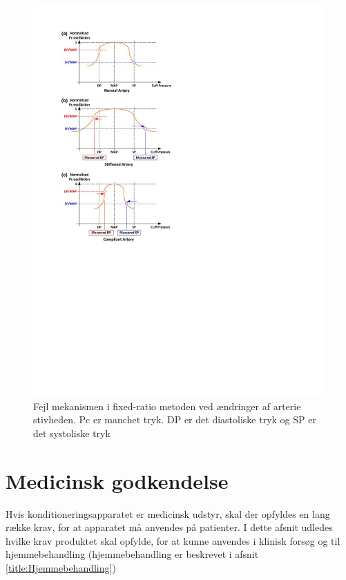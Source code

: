 \begin{minipage}[t]{0.5\textwidth}
	\begin{figure}[H]
		\centering
		\includegraphics[width=1\textwidth]{billeder/ErrorFixed-Ratio.pdf}
		\caption{Fejl mekanismen i fixed-ratio metoden ved ændringer af arterie stivheden. Pc er manchet tryk. DP er det diastoliske tryk og SP er det systoliske tryk}\label{fig:ErrorMechanismOfFixedRatio}
	\end{figure}
\end{minipage}

\section{Medicinsk godkendelse} \label{title:medGodkendelse}
Hvis konditioneringsapparatet er medicinsk udstyr, skal der opfyldes en lang række krav, for at apparatet må anvendes på patienter. I dette afsnit udledes hvilke krav produktet skal opfylde, for at kunne anvendes i klinisk forsøg og til hjemmebehandling (hjemmebehandling er beskrevet i afsnit \ref{title:Hjemmebehandling})

